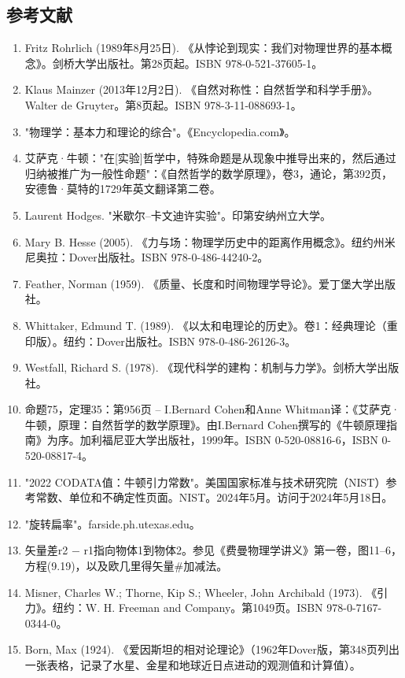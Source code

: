 \subsection{参考文献}
\begin{enumerate}
\item Fritz Rohrlich (1989年8月25日). 《从悖论到现实：我们对物理世界的基本概念》。剑桥大学出版社。第28页起。ISBN 978-0-521-37605-1。
\item Klaus Mainzer (2013年12月2日). 《自然对称性：自然哲学和科学手册》。Walter de Gruyter。第8页起。ISBN 978-3-11-088693-1。
\item "物理学：基本力和理论的综合"。《Encyclopedia.com》。
\item 艾萨克·牛顿："在[实验]哲学中，特殊命题是从现象中推导出来的，然后通过归纳被推广为一般性命题"：《自然哲学的数学原理》，卷3，通论，第392页，安德鲁·莫特的1729年英文翻译第二卷。
\item Laurent Hodges. "米歇尔–卡文迪许实验"。印第安纳州立大学。
\item Mary B. Hesse (2005). 《力与场：物理学历史中的距离作用概念》。纽约州米尼奥拉：Dover出版社。ISBN 978-0-486-44240-2。
\item Feather, Norman (1959). 《质量、长度和时间物理学导论》。爱丁堡大学出版社。
\item Whittaker, Edmund T. (1989). 《以太和电理论的历史》。卷1：经典理论（重印版）。纽约：Dover出版社。ISBN 978-0-486-26126-3。
\item Westfall, Richard S. (1978). 《现代科学的建构：机制与力学》。剑桥大学出版社。
\item 命题75，定理35：第956页 – I.Bernard Cohen和Anne Whitman译：《艾萨克·牛顿，原理：自然哲学的数学原理》。由I.Bernard Cohen撰写的《牛顿原理指南》为序。加利福尼亚大学出版社，1999年。ISBN 0-520-08816-6，ISBN 0-520-08817-4。
\item "2022 CODATA值：牛顿引力常数"。美国国家标准与技术研究院（NIST）参考常数、单位和不确定性页面。NIST。2024年5月。访问于2024年5月18日。
\item "旋转扁率"。farside.ph.utexas.edu。
\item 矢量差r2 − r1指向物体1到物体2。参见《费曼物理学讲义》第一卷，图11–6，方程(9.19)，以及欧几里得矢量#加减法。
\item Misner, Charles W.; Thorne, Kip S.; Wheeler, John Archibald (1973). 《引力》。纽约：W. H. Freeman and Company。第1049页。ISBN 978-0-7167-0344-0。
\item Born, Max (1924). 《爱因斯坦的相对论理论》（1962年Dover版，第348页列出一张表格，记录了水星、金星和地球近日点进动的观测值和计算值）。

\end{enumerate}
